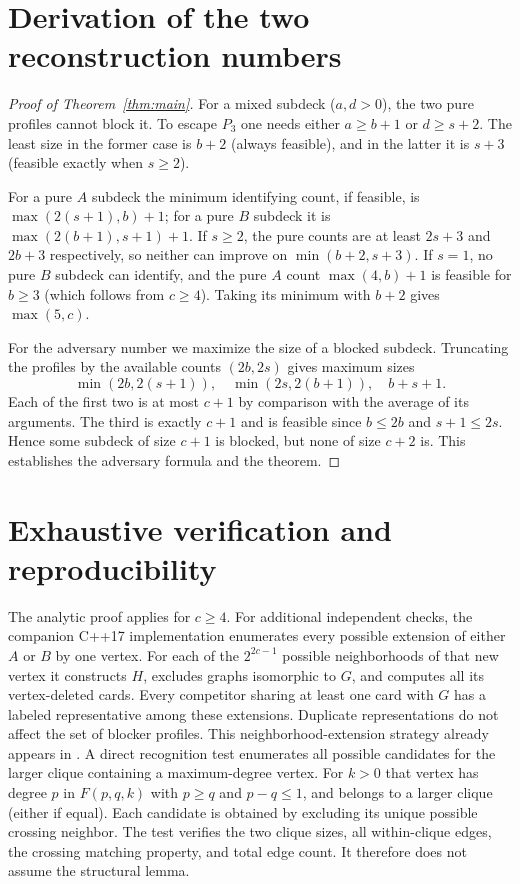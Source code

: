 \documentclass[11pt]{article}
\begin{document}
\section{Derivation of the two reconstruction numbers}
\begin{proof}[Proof of Theorem~\ref{thm:main}]
For a mixed subdeck ($a,d>0$), the two pure profiles cannot block it. To escape $P_3$ one needs either $a\geq b+1$ or $d\geq s+2$. The least size in the former case is $b+2$ (always feasible), and in the latter it is $s+3$ (feasible exactly when $s\geq2$).

For a pure $A$ subdeck the minimum identifying count, if feasible, is $\max(2(s+1),b)+1$; for a pure $B$ subdeck it is $\max(2(b+1),s+1)+1$. If $s\geq2$, the pure counts are at least $2s+3$ and $2b+3$ respectively, so neither can improve on $\min(b+2,s+3)$. If $s=1$, no pure $B$ subdeck can identify, and the pure $A$ count $\max(4,b)+1$ is feasible for $b\geq3$ (which follows from $c\geq4$). Taking its minimum with $b+2$ gives $\max(5,c)$.

For the adversary number we maximize the size of a blocked subdeck. Truncating the profiles by the available counts $(2b,2s)$ gives maximum sizes
\[
 \min(2b,2(s+1)),\quad \min(2s,2(b+1)),\quad b+s+1.
\]
Each of the first two is at most $c+1$ by comparison with the average of its arguments. The third is exactly $c+1$ and is feasible since $b\leq2b$ and $s+1\leq2s$. Hence some subdeck of size $c+1$ is blocked, but none of size $c+2$ is. This establishes the adversary formula and the theorem.
\end{proof}
\section{Exhaustive verification and reproducibility}
The analytic proof applies for $c\geq4$. For additional independent checks, the companion C++17 implementation enumerates every possible extension of either $A$ or $B$ by one vertex. For each of the $2^{2c-1}$ possible neighborhoods of that new vertex it constructs $H$, excludes graphs isomorphic to $G$, and computes all its vertex-deleted cards. Every competitor sharing at least one card with $G$ has a labeled representative among these extensions. Duplicate representations do not affect the set of blocker profiles. This neighborhood-extension strategy already appears in \cite[Section 3]{MR}. A direct recognition test enumerates all possible candidates for the larger clique containing a maximum-degree vertex. For $k>0$ that vertex has degree $p$ in $F(p,q,k)$ with $p\geq q$ and $p-q\leq1$, and belongs to a larger clique (either if equal). Each candidate is obtained by excluding its unique possible crossing neighbor. The test verifies the two clique sizes, all within-clique edges, the crossing matching property, and total edge count. It therefore does not assume the structural lemma.
\end{document}
